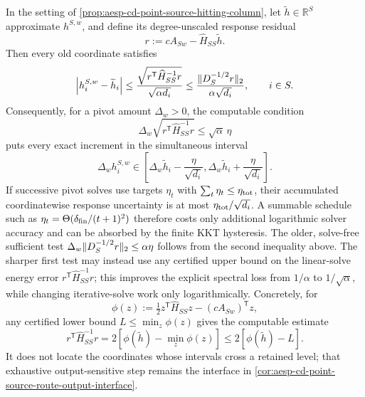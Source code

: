 \begin{lemma}
\label{lem:aesp-cd-point-source-response-residual-certificate}
In the setting of
\cref{prop:aesp-cd-point-source-hitting-column}, let
\(\widetilde h\in\mathbb R^S\) approximate \(h^{S,w}\), and define its
degree-unscaled response residual
\begin{equation*}
 r:=cA_{Sw}-\widehat H_{SS}\widetilde h.
\end{equation*}
Then every old coordinate satisfies
\begin{equation}
 \left|h_i^{S,w}-\widetilde h_i\right|
 \leq
 \frac{\sqrt{r^{\mathsf T}\widehat H_{SS}^{-1}r}}
      {\sqrt{\alpha d_i}}
 \leq\frac{\lVert D_S^{-1/2}r\rVert_2}{\alpha\sqrt{d_i}},
 \qquad i\in S.
 \label{eq:aesp-cd-point-source-response-residual-certificate}
\end{equation}
Consequently, for a pivot amount \(\Delta_w>0\), the computable condition
\begin{equation}
 \Delta_w\sqrt{r^{\mathsf T}\widehat H_{SS}^{-1}r}
 \leq\sqrt\alpha\,\eta
 \label{eq:aesp-cd-point-source-response-residual-target}
\end{equation}
puts every exact increment in the simultaneous interval
\begin{equation*}
 \Delta_wh_i^{S,w}
 \in\left[
  \Delta_w\widetilde h_i-\frac{\eta}{\sqrt{d_i}},
  \Delta_w\widetilde h_i+\frac{\eta}{\sqrt{d_i}}
 \right].
\end{equation*}
If successive pivot solves use targets \(\eta_t\) with
\(\sum_t\eta_t\leq\eta_{\rm tot}\), their accumulated coordinatewise
response uncertainty is at most
\(\eta_{\rm tot}/\sqrt{d_i}\).  A summable schedule such as
\(\eta_t=\Theta(\delta_{\rm fin}/(t+1)^2)\) therefore costs only additional
logarithmic solver accuracy and can be absorbed by the finite KKT hysteresis.
The older, solve-free sufficient test
\(\Delta_w\lVert D_S^{-1/2}r\rVert_2\leq\alpha\eta\) follows from the second
inequality above.  The sharper first test may instead use any certified upper
bound on the linear-solve energy error
\(r^{\mathsf T}\widehat H_{SS}^{-1}r\); this improves the explicit spectral
loss from \(1/\alpha\) to \(1/\sqrt\alpha\), while changing iterative-solve
work only logarithmically.  Concretely, for
\begin{equation*}
 \phi(z):=\tfrac12z^{\mathsf T}\widehat H_{SS}z
          -(cA_{Sw})^{\mathsf T}z,
\end{equation*}
any certified lower bound \(L\leq\min_z\phi(z)\) gives the computable estimate
\begin{equation}
 r^{\mathsf T}\widehat H_{SS}^{-1}r
 =2[\phi(\widetilde h)-\min_z\phi(z)]
 \leq2[\phi(\widetilde h)-L].
 \label{eq:aesp-cd-point-source-response-gap-certificate}
\end{equation}
It does not locate the coordinates whose
intervals cross a retained level;
that exhaustive output-sensitive step remains the interface in
\cref{cor:aesp-cd-point-source-route-output-interface}.
\end{lemma}

